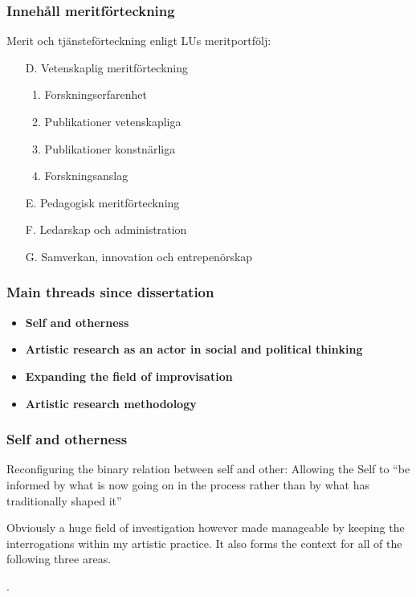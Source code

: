 \documentclass{beamer}
\begin{document}

\begin{frame}
\frametitle{Innehåll meritförteckning}

Merit och tjänsteförteckning enligt LUs meritportfölj:
\begin{enumerate}
  \item[D.] Vetenskaplig meritförteckning
    \begin{enumerate}
      \item Forskningserfarenhet
      \item Publikationer vetenskapliga
      \item Publikationer konstnärliga
      \item Forskningsanslag
    \end{enumerate}
  \item[E.] Pedagogisk meritförteckning
  \item[F.] Ledarskap och administration
  \item[G.] Samverkan, innovation och entrepenörskap
  \end{enumerate}

\end{frame}


\begin{frame}
\frametitle{Main threads since dissertation}

\begin{itemize}
\item \textbf{Self and otherness}
\item \textbf{Artistic research as an actor in social and political thinking}
\item \textbf{Expanding the field of improvisation}
\item \textbf{Artistic research methodology}
\end{itemize}

\end{frame}


\begin{frame}
\frametitle{Self and otherness}

Reconfiguring the binary relation between self and other: Allowing the Self to ``be informed by what is now going on in the process rather than by what has traditionally shaped it'' 

Obviously a huge field of investigation however made manageable by keeping the interrogations within my artistic practice. It also forms the context for all of the following three areas.

\vspace{0.5cm}
.

\end{frame}
\end{document}
